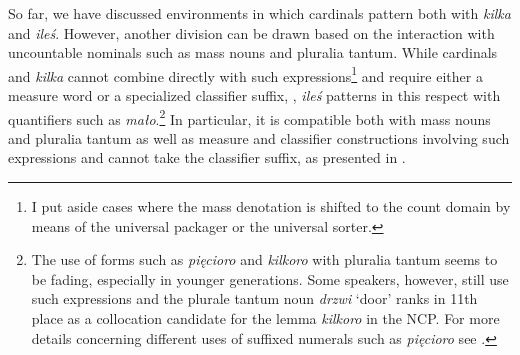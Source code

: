 \documentclass[output=paper,
]{langscibook}
\begin{document}
	So far, we have discussed environments in which cardinals pattern both with \textit{kilka} and \textit{ileś}. However, another division can be drawn based on the interaction with uncountable nominals such as mass nouns and pluralia tantum. While cardinals and \textit{kilka} cannot combine directly with such expressions\footnote{I put aside cases where the mass denotation is shifted to the count domain by means of the universal packager or the universal sorter.} and require either a measure word or a specialized classifier suffix, , \textit{ileś} patterns in this respect with quantifiers such as \textit{mało}.\footnote{The use of forms such as \textit{pięcioro} and \textit{kilkoro} with pluralia tantum seems to be fading, especially in younger generations. Some speakers, however, still use such expressions and the plurale tantum noun \textit{drzwi} `door' ranks in 11th place as a collocation candidate for the lemma \textit{kilkoro} in the NCP. For more details concerning different uses of suffixed numerals such as \textit{pięcioro} see \cite{wagiel2014boys,wagiel2015sums}.} In particular, it is compatible both with mass nouns and pluralia tantum as well as measure and classifier constructions involving such expressions and cannot take the classifier suffix, as presented in .
	
	\ea \label{ex:uncountable-nps-cardinals-kilka}  
	\z
    \z
\end{document}
